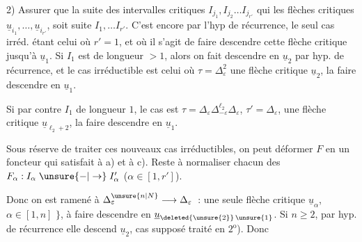 2) Assurer que la suite des intervalles critiques $I_{j_1},I_{j_2}\ldots I_{j_{r'}}$ qui  les flèches critiques $\underline{u}_{i_1},\ldots,\underline{u}_{i_{r'}}$,  soit  suite $I_1,\ldots I_{r'}$.
C'est encore  par l'hyp de récurrence, le seul cas irréd. étant celui où $r'=1$, et où il  s'agit de faire descendre cette flèche critique jusqu'à $\underline{u}_1$. Si $I_1$ est de longueur $>1$, alors on fait descendre en $\underline{u}_2$ par hyp. de récurrence, et le cas irréductible est celui où $\boxed{\tau=\Delta_\varepsilon^2}$ une flèche critique $\underline{u}_2$, la faire descendre en $\underline{u}_1$.

Si par contre $I_1$ de longueur $1$, le cas  est $\boxed{\tau=\Delta_\varepsilon\Delta_{-\varepsilon}^{\ell_2}\Delta_\varepsilon}$,  $\tau'=\Delta_\varepsilon$, une flèche critique $\underline{u}_{\ell_2+2}$, la faire descendre en $\underline{u}_1$.

Sous réserve de traiter ces  nouveaux cas irréductibles, on peut déformer $F$ en un foncteur qui satisfait à a) et à c). Reste à normaliser chacun des $F_\alpha:I_\alpha\mathrel{\unsure{-|\to}}I'_\alpha$ ($\alpha\in[1,r']$).

Donc on est ramené à $\Delta_\varepsilon^{\unsure{n|N}}\longrightarrow\Delta_\varepsilon$~: \unsure{$\{$}une seule flèche critique\unsure{$\}$} $\underline{u}_\alpha$, $\alpha\in[1,n]$ $\}$, à faire descendre en $\underline{u}_{\deleted{\unsure{2}}\,\unsure{1}}$. Si $n\geq2$, par hyp. de récurrence elle descend  $\underline{u}_2$, cas supposé traité en $2^{\mathrm{o}}$). Donc
